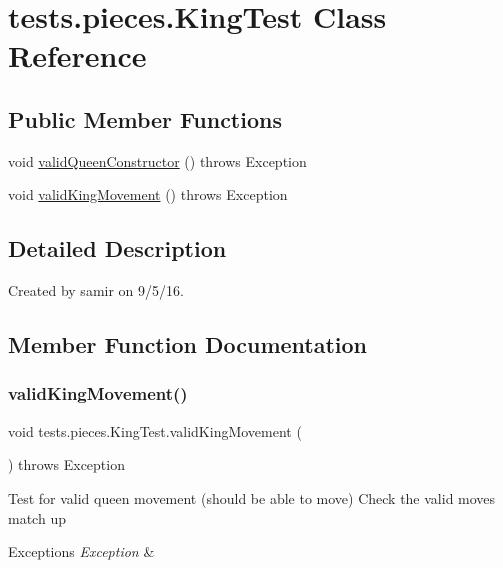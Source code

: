 \hypertarget{classtests_1_1pieces_1_1_king_test}{}\section{tests.\+pieces.\+King\+Test Class Reference}
\label{classtests_1_1pieces_1_1_king_test}
\subsection*{Public Member Functions}
\begin{DoxyCompactItemize}
\item 
void \hyperlink{classtests_1_1pieces_1_1_king_test_a1d202d75c158a39040fc84f7a5e42db7}{valid\+Queen\+Constructor} ()  throws Exception 
\item 
void \hyperlink{classtests_1_1pieces_1_1_king_test_a50ab715ea6df03436f548340ca2f9ab6}{valid\+King\+Movement} ()  throws Exception 
\end{DoxyCompactItemize}


\subsection{Detailed Description}
Created by samir on 9/5/16. 

\subsection{Member Function Documentation}
\hypertarget{classtests_1_1pieces_1_1_king_test_a50ab715ea6df03436f548340ca2f9ab6}{}\label{classtests_1_1pieces_1_1_king_test_a50ab715ea6df03436f548340ca2f9ab6} 
\subsubsection{\texorpdfstring{valid\+King\+Movement()}{validKingMovement()}}
{\footnotesize\ttfamily void tests.\+pieces.\+King\+Test.\+valid\+King\+Movement (\begin{DoxyParamCaption}{ }\end{DoxyParamCaption}) throws Exception}

Test for valid queen movement (should be able to move) Check the valid moves match up 
\begin{DoxyExceptions}{Exceptions}
{\em Exception} & \\
\hline
\end{DoxyExceptions}
\hypertarget{classtests_1_1pieces_1_1_king_test_a1d202d75c158a39040fc84f7a5e42db7}{}\label{classtests_1_1pieces_1_1_king_test_a1d202d75c158a39040fc84f7a5e42db7} 
